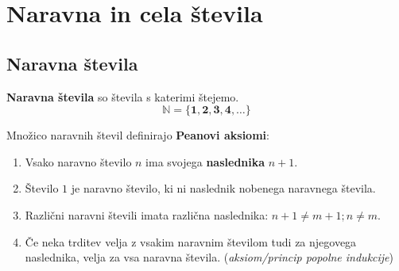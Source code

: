 \chapter{Naravna in cela števila}

 
     \section{Naravna števila}

            \textbf{Naravna števila} so števila s katerimi štejemo.
            $$\mathbf{\mathbb{N}=\{1, 2, 3, 4, \ldots\}}$$
         

          
            Množico naravnih števil definirajo \textbf{Peanovi aksiomi}:
            \begin{enumerate}
                \item Vsako naravno število $n$ ima svojega \textbf{naslednika} $n+1$.
                \item Število $1$ je naravno število, ki ni naslednik nobenega naravnega števila.
                \item Različni naravni števili imata različna naslednika: $n+1 \neq m+1; n \neq m$.
                \item Če neka trditev velja z vsakim naravnim številom tudi za njegovega naslednika, velja za vsa naravna števila. (\textit{aksiom/princip popolne indukcije})
            \end{enumerate}

         
 

 

